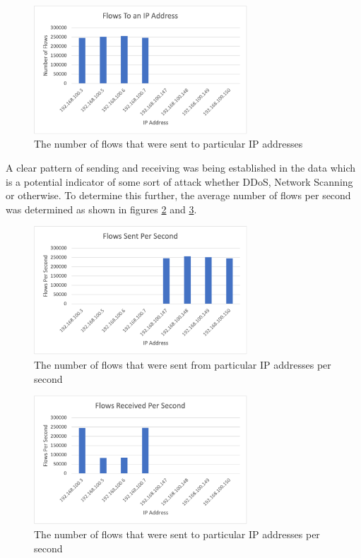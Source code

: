 \documentclass[conference]{IEEEtran}
\begin{document}
\begin{figure}[h]
    \includegraphics[width=8cm]{Figure2.png}
    \centering
    \caption{The number of flows that were sent to particular IP addresses}
    \label{fig:flowto}
\end{figure}

A clear pattern of sending and receiving was being established in the data which is a potential indicator of some
sort of attack whether DDoS, Network Scanning or otherwise. To determine this further, the average number of flows
per second was determined as shown in figures \ref{fig:sentfrompersec} and \ref{fig:senttopersec}.

\begin{figure}[h]
    \includegraphics[width=8cm]{Figure3.png}
    \centering
    \caption{The number of flows that were sent from particular IP addresses per second}
    \label{fig:sentfrompersec}
\end{figure}

\begin{figure}[h]
    \includegraphics[width=8cm]{Figure4.png}
    \centering
    \caption{The number of flows that were sent to particular IP addresses per second}
    \label{fig:senttopersec}
\end{figure}
\end{document}
